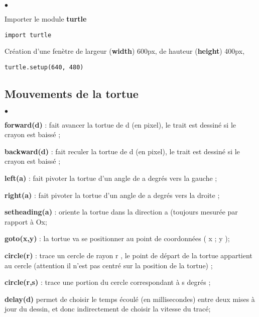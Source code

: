 \documentclass[10pt,dvipsnames,  dvips]{article}
\begin{document}
\begin{list}{$\bullet$}{}
\item Importer le module \textbf{turtle}  
\begin{lstlisting}
import turtle
\end{lstlisting}
\item Création d'une fenètre de largeur  (\textbf{width})  600px, de hauteur (\textbf{height}) 400px, \\
\begin{lstlisting}
turtle.setup(640, 480) 
\end{lstlisting}
\end{list}

\begin{center}
\end{center}

\subsection{ Mouvements de la tortue}

\begin{list}{$\bullet$}{}
\item  \textbf{forward(d)} : fait avancer la tortue de d (en pixel), le trait est dessiné si le crayon est baissé ;
\item  \textbf{backward(d)} : fait reculer la tortue de d (en pixel), le trait est dessiné si le crayon est baissé ;
\item  \textbf{left(a)} : fait pivoter la tortue d’un angle de a degrés vers la gauche ;
\item  \textbf{right(a)} : fait pivoter la tortue d’un angle de a degrés vers la droite ;
\item  \textbf{setheading(a)} : oriente la tortue dans la direction a (toujours mesurée par rapport à Ox;
\item  \textbf{goto(x,y)} : la tortue va se positionner au point de coordonnées ( x ; y );
\item  \textbf{circle(r)} : trace un cercle de rayon r , le point de départ de la tortue appartient au cercle (attention il n’est
pas centré sur la position de la tortue) ;
\item  \textbf{circle(r,s)} : trace une portion du cercle correspondant à s degrés ;
\item \textbf{delay(d)} permet de choisir le temps écoulé (en millisecondes) entre deux mises à jour du dessin, et donc indirectement de choisir la vitesse du tracé;
\end{list}
\end{document}
